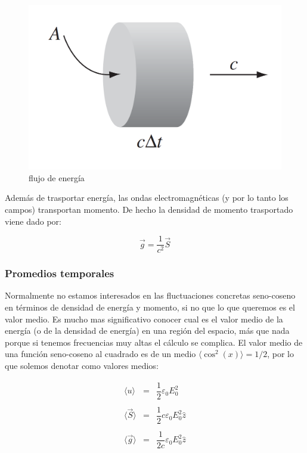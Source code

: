 \documentclass[12pt,a4paper]{article}
\begin{document}
\begin{figure}[h!] \centering
\includegraphics[scale=0.4]{densidadenergia.png}
\caption{flujo de energía}
\end{figure}

Además de trasportar energía, las ondas electromagnéticas (y por lo tanto los campos) transportan momento. De hecho la densidad de momento trasportado viene dado por:

\begin{equation}
\vec{g} = \dfrac{1}{c^2} \vec{S}
\end{equation}



\subsubsection{Promedios temporales}

Normalmente no estamos interesados en las fluctuaciones concretas seno-coseno en términos de densidad de energía y momento, si no que lo que queremos es el valor medio. Es mucho mas significativo conocer cual es el valor medio de la energía (o de la densidad de energía) en una región del espacio, más que nada porque si tenemos frecuencias muy altas el cálculo se complica. El valor medio de una función seno-coseno al cuadrado es de un medio $\langle \cos^2 (x) \rangle = 1/2$, por lo que solemos denotar como valores medios:

\begin{equation}
\begin{array}{lll}

\langle u \rangle & = & \dfrac{1}{2} \varepsilon_0  E_0 ^2 \\ \\

\langle \vec{S} \rangle & = & \dfrac{1}{2} c \varepsilon_0  E_0 ^2 \widehat{z} \\ \\

\langle \vec{g} \rangle & = & \dfrac{1}{2c} \varepsilon_0  E_0 ^2 \widehat{z}
 

\end{array}
\end{equation}
\end{document}
